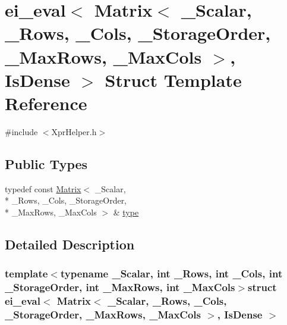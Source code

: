 \hypertarget{structei__eval_3_01_matrix_3_01___scalar_00_01___rows_00_01___cols_00_01___storage_order_00_01__1037d2a498088b119b5d3833e22bfc54}{\section{ei\-\_\-eval$<$ Matrix$<$ \-\_\-\-Scalar, \-\_\-\-Rows, \-\_\-\-Cols, \-\_\-\-Storage\-Order, \-\_\-\-Max\-Rows, \-\_\-\-Max\-Cols $>$, Is\-Dense $>$ Struct Template Reference}
\label{structei__eval_3_01_matrix_3_01___scalar_00_01___rows_00_01___cols_00_01___storage_order_00_01__1037d2a498088b119b5d3833e22bfc54}
}


{\ttfamily \#include $<$Xpr\-Helper.\-h$>$}

\subsection*{Public Types}
\begin{DoxyCompactItemize}
\item 
typedef const \hyperlink{class_matrix}{Matrix}$<$ \-\_\-\-Scalar, \\*
\-\_\-\-Rows, \-\_\-\-Cols, \-\_\-\-Storage\-Order, \\*
\-\_\-\-Max\-Rows, \-\_\-\-Max\-Cols $>$ \& \hyperlink{structei__eval_3_01_matrix_3_01___scalar_00_01___rows_00_01___cols_00_01___storage_order_00_01__1037d2a498088b119b5d3833e22bfc54_adcfa88c97095bc9228f69a7161c34e01}{type}
\end{DoxyCompactItemize}


\subsection{Detailed Description}
\subsubsection*{template$<$typename \-\_\-\-Scalar, int \-\_\-\-Rows, int \-\_\-\-Cols, int \-\_\-\-Storage\-Order, int \-\_\-\-Max\-Rows, int \-\_\-\-Max\-Cols$>$struct ei\-\_\-eval$<$ Matrix$<$ \-\_\-\-Scalar, \-\_\-\-Rows, \-\_\-\-Cols, \-\_\-\-Storage\-Order, \-\_\-\-Max\-Rows, \-\_\-\-Max\-Cols $>$, Is\-Dense $>$}



